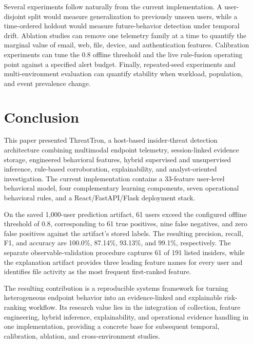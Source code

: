 Several experiments follow naturally from the current implementation. A user-disjoint split would measure generalization to previously unseen users, while a time-ordered holdout would measure future-behavior detection under temporal drift. Ablation studies can remove one telemetry family at a time to quantify the marginal value of email, web, file, device, and authentication features. Calibration experiments can tune the 0.8 offline threshold and the live rule-fusion operating point against a specified alert budget. Finally, repeated-seed experiments and multi-environment evaluation can quantify stability when workload, population, and event prevalence change.

\section{Conclusion}
This paper presented ThreatTron, a host-based insider-threat detection architecture combining multimodal endpoint telemetry, session-linked evidence storage, engineered behavioral features, hybrid supervised and unsupervised inference, rule-based corroboration, explainability, and analyst-oriented investigation. The current implementation contains a 33-feature user-level behavioral model, four complementary learning components, seven operational behavioral rules, and a React/FastAPI/Flask deployment stack.

On the saved 1,000-user prediction artifact, 61 users exceed the configured offline threshold of 0.8, corresponding to 61 true positives, nine false negatives, and zero false positives against the artifact's stored labels. The resulting precision, recall, F1, and accuracy are 100.0\%, 87.14\%, 93.13\%, and 99.1\%, respectively. The separate observable-validation procedure captures 61 of 191 listed insiders, while the explanation artifact provides three leading feature names for every user and identifies file activity as the most frequent first-ranked feature.

The resulting contribution is a reproducible systems framework for turning heterogeneous endpoint behavior into an evidence-linked and explainable risk-ranking workflow. Its research value lies in the integration of collection, feature engineering, hybrid inference, explainability, and operational evidence handling in one implementation, providing a concrete base for subsequent temporal, calibration, ablation, and cross-environment studies.

